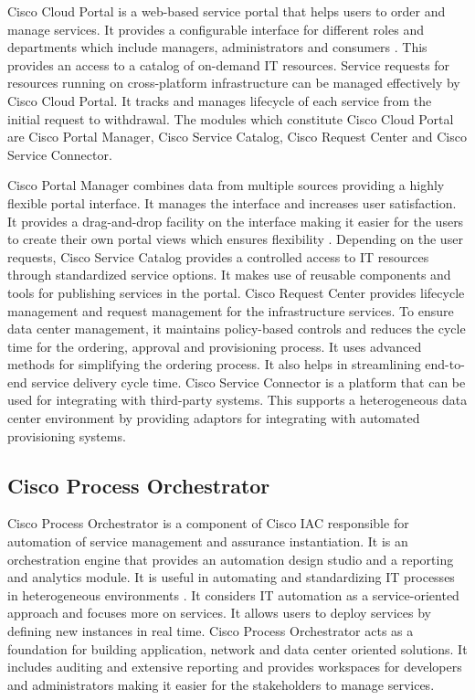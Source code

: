 \documentclass[9pt,twocolumn,twoside]{../../styles/osajnl}
\begin{document}
Cisco Cloud Portal is a web-based service portal that helps users to
order and manage services. It provides a configurable interface for
different roles and departments which include managers, administrators
and consumers \cite{cisco-datasheet}. This provides an access to a
catalog of on-demand IT resources. Service requests for resources
running on cross-platform infrastructure can be managed effectively by
Cisco Cloud Portal. It tracks and manages lifecycle of each service
from the initial request to withdrawal. The modules which constitute
Cisco Cloud Portal are Cisco Portal Manager, Cisco Service Catalog,
Cisco Request Center and Cisco Service Connector.

Cisco Portal Manager combines data from multiple sources providing a
highly flexible portal interface. It manages the interface and
increases user satisfaction. It provides a drag-and-drop facility on
the interface making it easier for the users to create their own
portal views which ensures flexibility
\cite{cloudportal-datasheet}. Depending on the user requests, Cisco
Service Catalog provides a controlled access to IT resources through
standardized service options. It makes use of reusable components and
tools for publishing services in the portal. Cisco Request Center
provides lifecycle management and request management for the
infrastructure services. To ensure data center management, it
maintains policy-based controls and reduces the cycle time for the
ordering, approval and provisioning process. It uses advanced methods
for simplifying the ordering process. It also helps in streamlining
end-to-end service delivery cycle time. Cisco Service Connector is a
platform that can be used for integrating with third-party
systems. This supports a heterogeneous data center environment by
providing adaptors for integrating with automated provisioning
systems.

\subsection{Cisco Process Orchestrator}

Cisco Process Orchestrator is a component of Cisco IAC responsible for
automation of service management and assurance instantiation. It is an
orchestration engine that provides an automation design studio and a
reporting and analytics module. It is useful in automating and
standardizing IT processes in heterogeneous environments
\cite{cisco-orchestrator}. It considers IT automation as a
service-oriented approach and focuses more on services. It allows
users to deploy services by defining new instances in real time. Cisco
Process Orchestrator acts as a foundation for building application,
network and data center oriented solutions. It includes auditing and
extensive reporting and provides workspaces for developers and
administrators making it easier for the stakeholders to manage
services.
\end{document}
